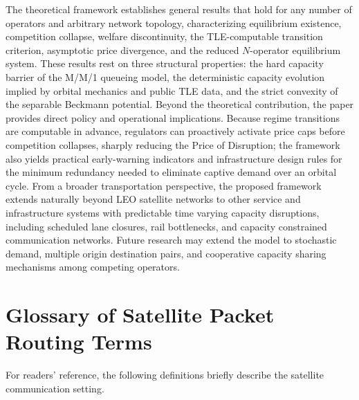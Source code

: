 \documentclass[review,3p,authoryear]{elsarticle}
\begin{document}
The theoretical framework establishes general results that hold for any number of operators and arbitrary network topology, characterizing equilibrium existence, competition collapse, welfare discontinuity, the TLE-computable transition criterion, asymptotic price divergence, and the reduced $N$-operator equilibrium system. These results rest on three structural properties: the hard capacity barrier of the M/M/1 queueing model, the deterministic capacity evolution implied by orbital mechanics and public TLE data, and the strict convexity of the separable Beckmann potential. Beyond the theoretical contribution, the paper provides direct policy and operational implications. Because regime transitions are computable in advance, regulators can proactively activate price caps before competition collapses, sharply reducing the Price of Disruption; the framework also yields practical early-warning indicators and infrastructure design rules for the minimum redundancy needed to eliminate captive demand over an orbital cycle. From a broader transportation perspective, the proposed framework extends naturally beyond LEO satellite networks to other service and infrastructure systems with predictable time varying capacity disruptions, including scheduled lane closures, rail bottlenecks, and capacity constrained communication networks. Future research may extend the model to stochastic demand, multiple origin destination pairs, and cooperative capacity sharing mechanisms among competing operators.

\appendix

\section{Glossary of Satellite Packet Routing Terms}

For readers' reference, the following definitions briefly describe the satellite communication setting.
\end{document}
